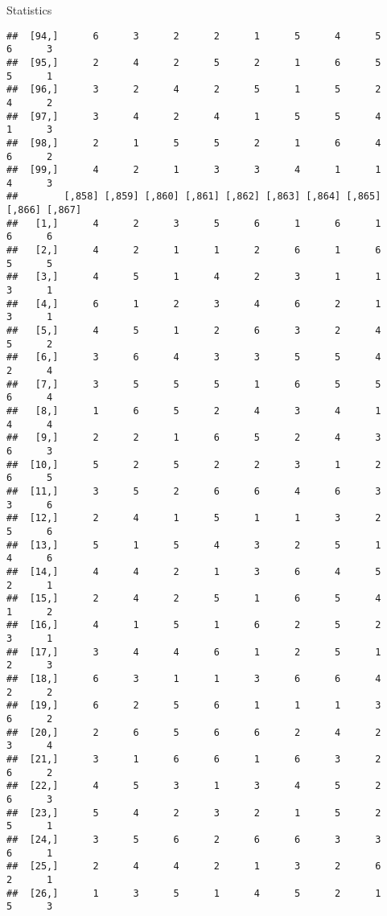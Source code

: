 \documentclass[
  ignorenonframetext,
]{beamer}
\begin{document}
\begin{frame}[fragile]{Statistics}
\begin{verbatim}
##  [94,]      6      3      2      2      1      5      4      5      6      3
##  [95,]      2      4      2      5      2      1      6      5      5      1
##  [96,]      3      2      4      2      5      1      5      2      4      2
##  [97,]      3      4      2      4      1      5      5      4      1      3
##  [98,]      2      1      5      5      2      1      6      4      6      2
##  [99,]      4      2      1      3      3      4      1      1      4      3
##        [,858] [,859] [,860] [,861] [,862] [,863] [,864] [,865] [,866] [,867]
##   [1,]      4      2      3      5      6      1      6      1      6      6
##   [2,]      4      2      1      1      2      6      1      6      5      5
##   [3,]      4      5      1      4      2      3      1      1      3      1
##   [4,]      6      1      2      3      4      6      2      1      3      1
##   [5,]      4      5      1      2      6      3      2      4      5      2
##   [6,]      3      6      4      3      3      5      5      4      2      4
##   [7,]      3      5      5      5      1      6      5      5      6      4
##   [8,]      1      6      5      2      4      3      4      1      4      4
##   [9,]      2      2      1      6      5      2      4      3      6      3
##  [10,]      5      2      5      2      2      3      1      2      6      5
##  [11,]      3      5      2      6      6      4      6      3      3      6
##  [12,]      2      4      1      5      1      1      3      2      5      6
##  [13,]      5      1      5      4      3      2      5      1      4      6
##  [14,]      4      4      2      1      3      6      4      5      2      1
##  [15,]      2      4      2      5      1      6      5      4      1      2
##  [16,]      4      1      5      1      6      2      5      2      3      1
##  [17,]      3      4      4      6      1      2      5      1      2      3
##  [18,]      6      3      1      1      3      6      6      4      2      2
##  [19,]      6      2      5      6      1      1      1      3      6      2
##  [20,]      2      6      5      6      6      2      4      2      3      4
##  [21,]      3      1      6      6      1      6      3      2      6      2
##  [22,]      4      5      3      1      3      4      5      2      6      3
##  [23,]      5      4      2      3      2      1      5      2      5      1
##  [24,]      3      5      6      2      6      6      3      3      6      1
##  [25,]      2      4      4      2      1      3      2      6      2      1
##  [26,]      1      3      5      1      4      5      2      1      5      3

\end{verbatim}
\end{frame}
\end{document}
